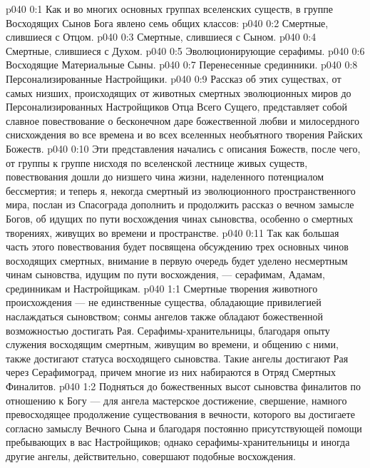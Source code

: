 \author{Могучий Вестник}
\vs p040 0:1 Как и во многих основных группах вселенских существ, в группе Восходящих Сынов Бога явлено семь общих классов:
\vs p040 0:2 \bibnobreakspace Смертные, слившиеся с Отцом.
\vs p040 0:3 \bibnobreakspace Смертные, слившиеся с Сыном.
\vs p040 0:4 \bibnobreakspace Смертные, слившиеся с Духом.
\vs p040 0:5 \bibnobreakspace Эволюционирующие серафимы.
\vs p040 0:6 \bibnobreakspace Восходящие Материальные Сыны.
\vs p040 0:7 \bibnobreakspace Перенесенные срединники.
\vs p040 0:8 \bibnobreakspace Персонализированные Настройщики.
\vs p040 0:9 \pc Рассказ об этих существах, от самых низших, происходящих от животных смертных эволюционных миров до Персонализированных Настройщиков Отца Всего Сущего, представляет собой славное повествование о бесконечном даре божественной любви и милосердного снисхождения во все времена и во всех вселенных необъятного творения Райских Божеств.
\vs p040 0:10 Эти представления начались с описания Божеств, после чего, от группы к группе нисходя по вселенской лестнице живых существ, повествования дошли до низшего чина жизни, наделенного потенциалом бессмертия; и теперь я, некогда смертный из эволюционного пространственного мира, послан из Спасограда дополнить и продолжить рассказ о вечном замысле Богов, об идущих по пути восхождения чинах сыновства, особенно о смертных творениях, живущих во времени и пространстве.
\vs p040 0:11 Так как большая часть этого повествования будет посвящена обсуждению трех основных чинов восходящих смертных, внимание в первую очередь будет уделено несмертным чинам сыновства, идущим по пути восхождения, --- серафимам, Адамам, срединникам и Настройщикам.
\vs p040 1:1 Смертные творения животного происхождения --- не единственные существа, обладающие привилегией наслаждаться сыновством; сонмы ангелов также обладают божественной возможностью достигать Рая. Серафимы\hyp{}хранительницы, благодаря опыту служения восходящим смертным, живущим во времени, и общению с ними, также достигают статуса восходящего сыновства. Такие ангелы достигают Рая через Серафимоград, причем многие из них набираются в Отряд Смертных Финалитов.
\vs p040 1:2 Подняться до божественных высот сыновства финалитов по отношению к Богу --- для ангела мастерское достижение, свершение, намного превосходящее продолжение существования в вечности, которого вы достигаете согласно замыслу Вечного Сына и благодаря постоянно присутствующей помощи пребывающих в вас Настройщиков; однако серафимы\hyp{}хранительницы и иногда другие ангелы, действительно, совершают подобные восхождения.
